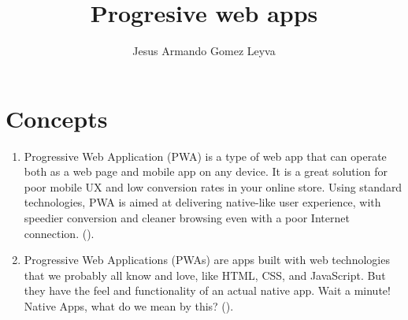 \documentclass[12pt]{article}
\title{Progresive web apps}
\author{Jesus Armando Gomez Leyva}
\begin{document}
\maketitle

\section{Concepts}

\begin{enumerate}
    \item Progressive Web Application (PWA) is a type of web app that can operate both as a web page and mobile app on any device. It is a great solution for poor mobile UX and low conversion rates in your online store. Using standard technologies, PWA is aimed at delivering native-like user experience, with speedier conversion and cleaner browsing even with a poor Internet connection. (\citep{PWA2}).
    \item Progressive Web Applications (PWAs) are apps built with web technologies that we probably all know and love, like HTML, CSS, and JavaScript. But they have the feel and functionality of an actual native app. Wait a minute! Native Apps, what do we mean by this? (\citep{PWA}).
\end{enumerate}
\end{document}
